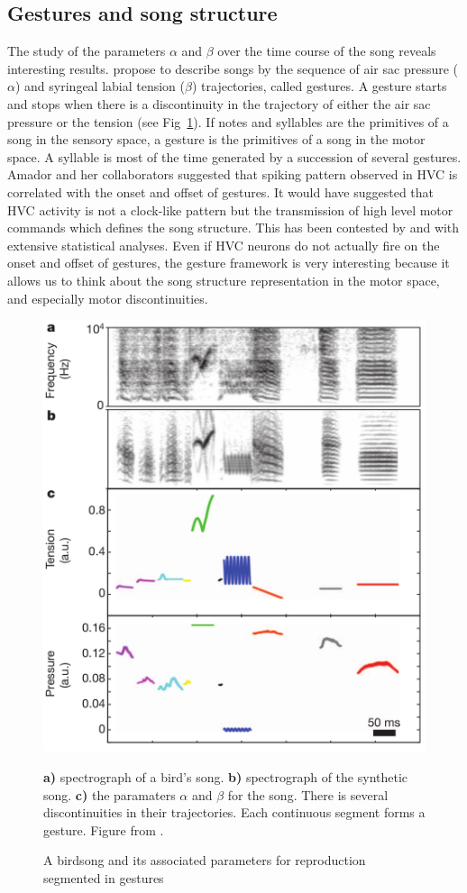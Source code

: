 \documentclass{report}
\begin{document}
\subsection{Gestures and song structure} \label{gestures-and-song-structure}

The study of the parameters \(\alpha\) and \(\beta\) over the time course of the
song reveals interesting results. \textcite{amador_elemental_2013} propose to
describe songs by the sequence of air sac pressure (\(\alpha\)) and syringeal
labial tension (\(\beta\)) trajectories, called gestures. A gesture starts and
stops when there is a discontinuity in the trajectory of either the air sac
pressure or the tension (see Fig~\ref{gestures_schema}). If notes and syllables
are the primitives of a song in the sensory space, a gesture is the primitives
of a song in the motor space. A syllable is most of the time generated by a
succession of several gestures. Amador and her collaborators suggested that
spiking pattern observed in HVC is correlated with the onset and offset of
gestures. It would have suggested that HVC activity is not a clock-like pattern
but the transmission of high level motor commands which defines the song
structure. This has been contested by \textcite{lynch_rhythmic_2016} and
\textcite{picardo_population-level_2016} with extensive statistical analyses.
Even if HVC neurons do not actually fire on the onset and offset of gestures,
the gesture framework is very interesting because it allows us to think about
the song structure representation in the motor space, and especially motor
discontinuities.

\begin{figure}[htbp]
  {\center
  \includegraphics[width=0.5\linewidth]{media/gesture_schema_amador}
  \caption{A birdsong and its associated parameters for reproduction segmented
  in gestures\label{gestures_schema}}}

  \small
  \textbf{a)} spectrograph of a bird's song. \textbf{b)} spectrograph of the
  synthetic song. \textbf{c)} the paramaters \(\alpha\) and \(\beta\) for the
  song. There is several discontinuities in their trajectories. Each continuous
  segment forms a gesture. Figure from \textcite{amador_elemental_2013}.

\end{figure}
\end{document}
